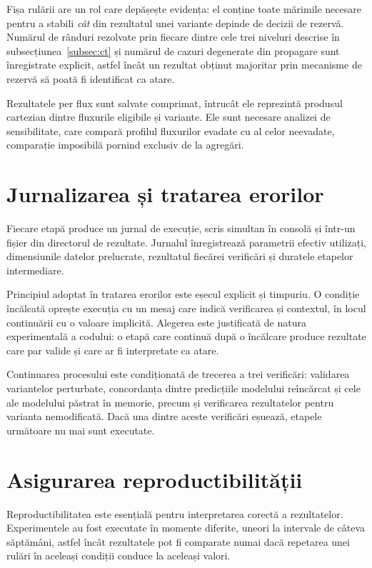 Fișa rulării are un rol care depășește evidența: el conține toate mărimile necesare pentru a stabili \emph{cât} din rezultatul unei variante depinde de decizii de rezervă. Numărul de rânduri rezolvate prin fiecare dintre cele trei niveluri descrise în subsecțiunea~\ref{subsec:ct} și numărul de cazuri degenerate din propagare sunt înregistrate explicit, astfel încât un rezultat obținut majoritar prin mecanisme de rezervă să poată fi identificat ca atare.

Rezultatele per flux sunt salvate comprimat, întrucât ele reprezintă produsul cartezian dintre fluxurile eligibile și variante. Ele sunt necesare analizei de sensibilitate, care compară profilul fluxurilor evadate cu al celor neevadate, comparație imposibilă pornind exclusiv de la agregări.

\section{Jurnalizarea și tratarea erorilor}\label{sec:jurnalizare}

Fiecare etapă produce un jurnal de execuție, scris simultan în consolă și într-un fișier din directorul de rezultate. Jurnalul înregistrează parametrii efectiv utilizați, dimensiunile datelor prelucrate, rezultatul fiecărei verificări și duratele etapelor intermediare.

Principiul adoptat în tratarea erorilor este eșecul explicit și timpuriu. O condiție încălcată oprește execuția cu un mesaj care indică verificarea și contextul, în locul continuării cu o valoare implicită. Alegerea este justificată de natura experimentală a codului: o etapă care continuă după o încălcare produce rezultate care par valide și care ar fi interpretate ca atare.

Continuarea procesului este condiționată de trecerea a trei verificări: validarea variantelor perturbate, concordanța dintre predicțiile modelului reîncărcat și cele ale modelului păstrat în memorie, precum și verificarea rezultatelor pentru varianta nemodificată. Dacă una dintre aceste verificări eșuează, etapele următoare nu mai sunt executate.


\section{Asigurarea reproductibilității}\label{sec:reproductibilitate}

Reproductibilitatea este esențială pentru interpretarea corectă a rezultatelor. Experimentele au fost executate în momente diferite, uneori la intervale de câteva săptămâni, astfel încât rezultatele pot fi comparate numai dacă repetarea unei rulări în aceleași condiții conduce la aceleași valori.


